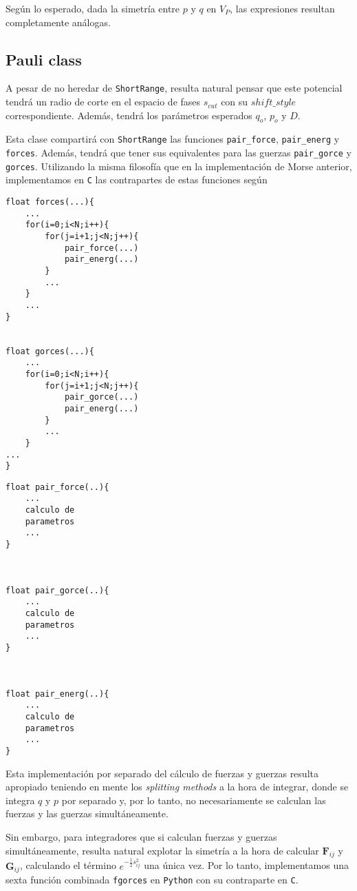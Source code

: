 \documentclass[twoside, 12pt]{article}
\begin{document}
Según lo esperado, dada la simetría entre $p$ y $q$ en $V_P$, las expresiones resultan completamente análogas. 

\subsection{Pauli class}

A pesar de no heredar de \texttt{ShortRange}, resulta natural pensar que este potencial tendrá un radio de corte en el espacio de fases $s_{cut}$ con su $shift\_style$ correspondiente. Además, tendrá los parámetros esperados $q_o$, $p_o$ y $D$.

Esta clase compartirá con \texttt{ShortRange} las funciones \texttt{pair\_force}, \texttt{pair\_energ} y \texttt{forces}. Además, tendrá que tener sus equivalentes para las guerzas \texttt{pair\_gorce} y \texttt{gorces}. Utilizando la misma filosofía que en la implementación de Morse anterior, implementamos en \texttt{C} las contrapartes de estas funciones según 

\begin{multicols}{2}
\begin{lstlisting}
float forces(...){
	...
	for(i=0;i<N;i++){
		for(j=i+1;j<N;j++){
			pair_force(...)
			pair_energ(...)
		}	
		...
	}
	...
}


float gorces(...){
	...
	for(i=0;i<N;i++){
		for(j=i+1;j<N;j++){
			pair_gorce(...)
			pair_energ(...)
		}	
		...
	}
...
}

\end{lstlisting} 
\columnbreak
\begin{lstlisting}
float pair_force(..){
	...
	calculo de 
	parametros
	...
}



float pair_gorce(..){
	...
	calculo de 
	parametros
	...
}



float pair_energ(..){
	...
	calculo de 
	parametros
	...
}

\end{lstlisting} 
\end{multicols}

Esta implementación por separado del cálculo de fuerzas y guerzas resulta apropiado teniendo en mente los \textit{splitting methods} a la hora de integrar, donde se integra $q$ y $p$ por separado y, por lo tanto, no necesariamente se calculan las fuerzas y las guerzas simultáneamente.

Sin embargo, para integradores que si calculan fuerzas y guerzas simultáneamente, resulta natural explotar la simetría a la hora de calcular $\mathbf{F}_{ij}$ y $\mathbf{G}_{ij}$, calculando el término $e^{-\frac{1}{2}s_{ij}^2}$ una única vez. Por lo tanto, implementamos una sexta función combinada \texttt{fgorces} en \texttt{Python} con su contraparte en \texttt{C}.
\end{document}
